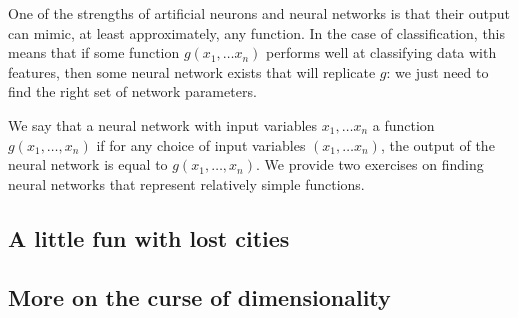 One of the strengths of artificial neurons and neural networks is that their output can mimic, at least approximately, any function. In the case of classification, this means that if some function $g(x_1, \ldots x_n)$ performs well at classifying data with  features, then some neural network exists that will replicate $g$: we just need to find the right set of network parameters.

We say that a neural network with input variables $x_1, \ldots x_n$  a function $g(x_1, \ldots, x_n)$ if for any choice of input variables $(x_1, \ldots x_n)$, the output of the neural network is equal to $g(x_1, \ldots, x_n)$.  We provide two exercises on finding neural networks that represent relatively simple functions.\\

\begin{exercise}\end{exercise}

\begin{exercise}[%
Consider the function $g(x_1, x_2)$ for binary input variables $x_1$ and $x_2$ that outputs 1 when $x_1 \neq x_2$ and 0 when $x_1 = x_2$. (The function \textvar{g} is known as an ``\texttt{XOR} gate'').  It can be shown that no single perceptron represents \textvar{g}; find a neural network of perceptrons that represents \textvar{g}.
]\end{exercise}

\subsection{A little fun with lost cities}

\begin{exercise}[%
Consider the three points $x = (-8, 1)$, $y = (7, 6)$, and $z = (10, -2)$. Say that the distances from these points to some point \textvar{w} with unknown location are as follows: $d(x, w) = 13$; $d(y, w) = 3$; $d(z, w) = 10$. Where is \textvar{w}?
]\end{exercise}

\subsection{More on the curse of dimensionality}

